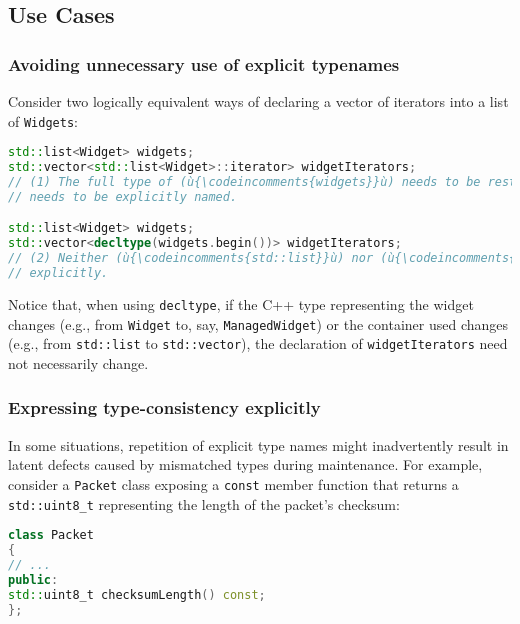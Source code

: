 \subsection[Use Cases]{Use Cases}\label{use-cases-decltype}

\subsubsection[Avoiding unnecessary use of explicit typenames]{Avoiding unnecessary use of explicit typenames}\label{avoiding-unnecessary-use-of-explicit-typenames}

Consider two logically equivalent ways of declaring a vector of
iterators into a list of \lstinline!Widgets!:

\begin{lstlisting}[language=C++]
std::list<Widget> widgets;
std::vector<std::list<Widget>::iterator> widgetIterators;
// (1) The full type of (ù{\codeincomments{widgets}}ù) needs to be restated, and (ù{\codeincomments{iterator}}ù)
// needs to be explicitly named.

std::list<Widget> widgets;
std::vector<decltype(widgets.begin())> widgetIterators;
// (2) Neither (ù{\codeincomments{std::list}}ù) nor (ù{\codeincomments{Widget}}ù) nor (ù{\codeincomments{iterator}}ù) need be named
// explicitly.
\end{lstlisting}

\noindent Notice that, when using \lstinline!decltype!, if the C++ type representing
the widget changes (e.g., from \lstinline!Widget! to, say,
\lstinline!ManagedWidget!) or the container used changes (e.g., from
\lstinline!std::list! to \lstinline!std::vector!), the declaration of
\lstinline!widgetIterators! need not necessarily change.

\subsubsection[Expressing type-consistency explicitly]{Expressing type-consistency explicitly}\label{expressing-type-consistency-explicitly}

In some situations, repetition of explicit type names might
inadvertently result in latent defects caused by mismatched types during
maintenance. For example, consider a \lstinline!Packet! class exposing a
\lstinline!const! member function that returns a \lstinline!std::uint8_t!
representing the length of the packet's checksum:

\begin{lstlisting}[language=C++]
class Packet
{
// ...
public:
std::uint8_t checksumLength() const;
};
\end{lstlisting}

